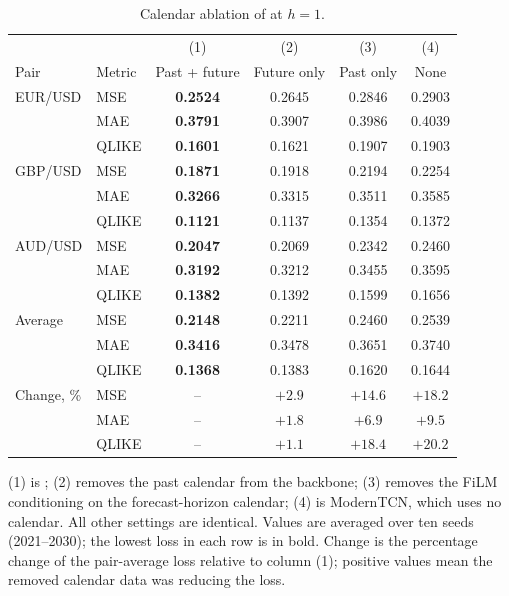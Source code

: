 \begin{table}[t]
  \centering
  \begin{threeparttable}
  \caption{Calendar ablation of \FiLMTCN{} at $h=1$.}
  \label{tab:ablation-h1}
  \begin{tabular}{llcccc}
    \toprule
    & & (1) & (2) & (3) & (4) \\
    Pair & Metric & Past + future & Future only & Past only & None \\
    \midrule
    EUR/USD            & MSE   & \textbf{0.2524} & 0.2645 & 0.2846 & 0.2903 \\
                       & MAE   & \textbf{0.3791} & 0.3907 & 0.3986 & 0.4039 \\
                       & QLIKE & \textbf{0.1601} & 0.1621 & 0.1907 & 0.1903 \\
    \addlinespace
    GBP/USD            & MSE   & \textbf{0.1871} & 0.1918 & 0.2194 & 0.2254 \\
                       & MAE   & \textbf{0.3266} & 0.3315 & 0.3511 & 0.3585 \\
                       & QLIKE & \textbf{0.1121} & 0.1137 & 0.1354 & 0.1372 \\
    \addlinespace
    AUD/USD            & MSE   & \textbf{0.2047} & 0.2069 & 0.2342 & 0.2460 \\
                       & MAE   & \textbf{0.3192} & 0.3212 & 0.3455 & 0.3595 \\
                       & QLIKE & \textbf{0.1382} & 0.1392 & 0.1599 & 0.1656 \\
    \addlinespace
    Average            & MSE   & \textbf{0.2148} & 0.2211 & 0.2460 & 0.2539 \\
                       & MAE   & \textbf{0.3416} & 0.3478 & 0.3651 & 0.3740 \\
                       & QLIKE & \textbf{0.1368} & 0.1383 & 0.1620 & 0.1644 \\
    \addlinespace
    Change, \%         & MSE   & -- & $+2.9$ & $+14.6$ & $+18.2$ \\
                       & MAE   & -- & $+1.8$ & $+6.9$ & $+9.5$ \\
                       & QLIKE & -- & $+1.1$ & $+18.4$ & $+20.2$ \\
    \bottomrule
  \end{tabular}
  \begin{tablenotes}[flushleft]\footnotesize
    \item (1) is \FiLMTCN{}; (2) removes the past calendar from the backbone; (3) removes the FiLM conditioning on the forecast-horizon calendar; (4) is ModernTCN, which uses no calendar. All other settings are identical. Values are averaged over ten seeds (2021--2030); the lowest loss in each row is in bold. Change is the percentage change of the pair-average loss relative to column (1); positive values mean the removed calendar data was reducing the loss.
  \end{tablenotes}
  \end{threeparttable}
\end{table}
